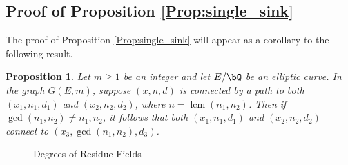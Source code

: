 \documentclass[11pt,reqno]{amsart}
\theoremstyle{plain}
\newtheorem{proposition}[theorem]{Proposition}
\theoremstyle{definition}
\DeclareMathOperator{\lcm}{lcm}
\newcommand{\Q}{\bQ}
\newcommand{\abedit}[1]{{\color{blue} #1}}
\begin{document}
\subsection{Proof of Proposition \ref{Prop:single_sink}}
The proof of Proposition \ref{Prop:single_sink} will appear as a corollary to the following result.

\begin{proposition}\label{Prop:gcd}
Let $m\geq 1$ be an integer and let $E/\Q$ be an elliptic curve. In the graph $G(E,m)$,
suppose $(x,n,d)$ is connected by a path to both $(x_1,n_1,d_1)$ and $(x_2,n_2,d_2)$, where $n=\lcm(n_1,n_2)$. Then \abedit{if $\gcd(n_1,n_2) \neq n_1,n_2$}, it follows that both $(x_1,n_1,d_1)$ and $(x_2,n_2,d_2)$ connect to $(x_3, \gcd(n_1,n_2),d_3)$.

\end{proposition}

%
%

        \begin{figure}[h]
        \begin{center}
        \end{center}
        \caption{Degrees of Residue Fields}
    \end{figure}
\end{document}
